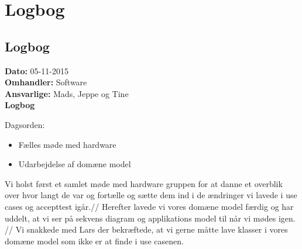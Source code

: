 \chapter{Logbog}
\section{Logbog}

\textbf{Dato:} 05-11-2015 \\
\textbf{Omhandler:} Software \\
\textbf{Ansvarlige:} Mads, Jeppe og Tine \\
\textbf{Logbog}

Dagsorden:
\begin{itemize}
	\item Fælles møde med hardware
	\item Udarbejdelse af domæne model 
\end{itemize}

Vi holst først et samlet møde med hardware gruppen for at danne et overblik over hvor langt de var og fortælle og sætte dem ind i de ændringer vi lavede i use cases og accepttest igår.//
Herefter lavede vi vores domæne model færdig og har uddelt, at vi ser på sekvens diagram og applikations model til når vi mødes igen. //
Vi snakkede med Lars der bekræftede, at vi gerne måtte lave klasser i vores domæne model som ikke er at finde i use casenen. 
   

